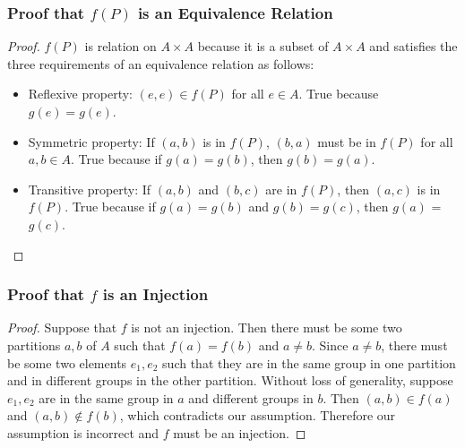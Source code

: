 \documentclass[12pt]{article}
\begin{document}
\subsubsection*{Proof that $f(P)$ is an Equivalence Relation}
\begin{proof}
$f(P)$ is relation on $A\times A$ because it is a subset of $A\times A$ and satisfies the three requirements of an equivalence relation as follows:
\begin{itemize}
\item Reflexive property: $(e, e) \in f(P)$ for all $e \in A$. True because $g(e) = g(e)$.    
\item Symmetric property: If $(a, b)$ is in $f(P)$, $(b, a)$ must be in $f(P)$ for all $a, b \in A$. True because if $g(a) = g(b)$, then $g(b) = g(a)$.
\item Transitive property: If $(a,b)$ and $(b,c)$ are in $f(P)$, then $(a,c)$ is in  $f(P)$. True because if $g(a) = g(b)$ and $g(b) = g(c)$, then $g(a)$ = $g(c)$.
\end{itemize}

\end{proof}
\subsubsection*{Proof that $f$ is an Injection}
\begin{proof}
Suppose that $f$ is not an injection. Then there must be some two partitions $a,b$ of $A$ such that $f(a) = f(b)$ and $a \neq b$. Since $a \neq b$, there must be some two elements $e_1, e_2$ such that they are in the same group in one partition and in different groups in the other partition. Without loss of generality, suppose $e_1, e_2$ are in the same group in $a$ and different groups in $b$. Then $(a,b) \in f(a)$ and $(a,b) \notin f(b)$, which contradicts our assumption. Therefore our assumption is incorrect and $f$ must be an injection.
\end{proof}
\end{document}

